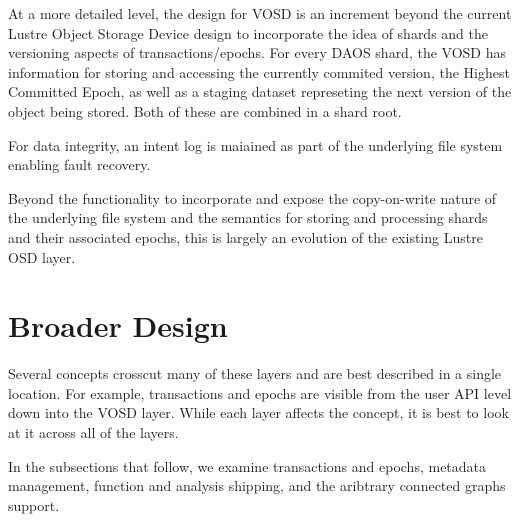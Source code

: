 \documentclass[conference]{IEEEtran}
\begin{document}
At a more detailed level, the design for VOSD is an increment beyond the
current Lustre Object Storage Device design to incorporate the idea of shards
and the versioning aspects of transactions/epochs. For every DAOS shard, the
VOSD has information for storing and accessing the currently commited version,
the Highest Committed Epoch, as well as a staging dataset represeting the
next version of the object being stored. Both of these are combined in a shard
root.

For data integrity, an intent log is maiained as part of the underlying file
system enabling fault recovery.

Beyond the functionality to incorporate and expose the copy-on-write nature
of the underlying file system and the semantics for storing and processing
shards and their associated epochs, this is largely an evolution of the
existing Lustre OSD layer.

\section{Broader Design}
\label{sec:broader}

Several concepts crosscut many of these layers and are best described in a
single location. For example, transactions and epochs are visible from the
user API level down into the VOSD layer. While each layer affects the concept,
it is best to look at it across all of the layers.

In the subsections that follow, we examine transactions and epochs, metadata
management, function and analysis shipping, and the aribtrary connected graphs
support.

%
%
\end{document}
